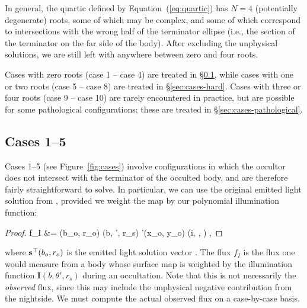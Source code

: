 \documentclass[modern]{aastex62}
\begin{document}
In general, the quartic defined by Equation~(\ref{eq:quartic}) has
$N=4$ (potentially degenerate) roots, some of which may be complex, and some
of which correspond to intersections with the wrong half of the
terminator ellipse (i.e., the section of the terminator on the far side
of the body). After excluding the unphysical solutions, we are still left with
anywhere between zero and four roots.

Cases with zero roots (case 1 -- case 4) are treated in \S\ref{sec:cases-easy},
while cases with one or two roots (case 5 -- case 8) are treated in
\S\ref{sec:cases-hard}. Cases with three or four roots
(case 9 -- case 10) are rarely encountered
in practice, but are possible for some pathological configurations; these are
treated in \S\ref{sec:cases-pathological}.

%

\subsection{Cases 1--5}
\label{sec:cases-easy}
%
Cases 1--5 (see Figure~\ref{fig:cases}) involve configurations in which the
occultor does not intersect with
the terminator of the occulted body, and are therefore fairly
straightforward to solve. In particular, we can use the original emitted
light solution from \citet{Luger2019}, provided we weight the map by our
polynomial illumination function:
%
\begin{proof}{}
    \label{eq:fI}
    f_I &=
    \sTe(b_o, r_o)
    (b, \theta', r_s)
    '(x_o, y_o)
    (i, \lambda, \vartheta)
    \quad,
\end{proof}
%
where $\mathbf{s}^\top(b_o, r_o)$ is the emitted light solution vector
\citep[Equation~26 in][]{Luger2019}. The flux $f_I$ is the flux one would
measure from a body whose surface map is weighted by the illumination function
$\mathbf{I}(b, \theta', r_s)$ during an occultation. Note that this is not
necessarily the \emph{observed} flux, since this may include the unphysical
negative contribution from the nightside. We must compute the actual
observed flux on a case-by-case basis.
\end{document}
